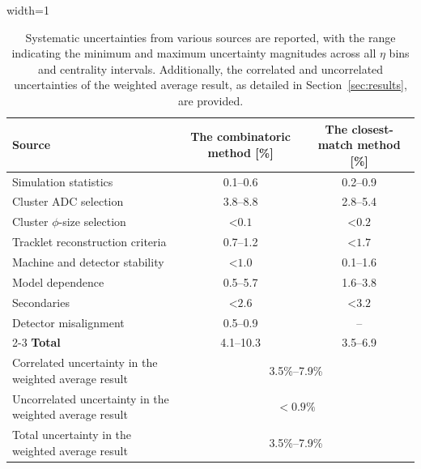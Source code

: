 \begin{table}[H]
    \centering
    \caption{Systematic uncertainties from various sources are reported, with the range indicating the minimum and maximum uncertainty magnitudes across all $\eta$ bins and centrality intervals. Additionally, the correlated and uncorrelated uncertainties of the weighted average result, as detailed in Section~\ref{sec:results}, are provided.}
    \begin{adjustbox}{width=1\textwidth}
    \begin{tabular}{l c c}
        \toprule[1pt]
        \textbf{Source} & \textbf{The combinatoric method [\%]} & \textbf{The closest-match method [\%]} \\
        \midrule[1pt]
        Simulation statistics & 0.1--0.6 & 0.2--0.9 \\
        Cluster ADC selection & 3.8--8.8 & 2.8--5.4 \\
        Cluster $\phi$-size selection & $<\text{0.1}$ & $<\text{0.2}$ \\
        Tracklet reconstruction criteria & 0.7--1.2 & $<\text{1.7}$ \\        
        Machine and detector stability & $<\text{1.0}$ & 0.1--1.6 \\
        Model dependence & 0.5--5.7 & 1.6--3.8 \\
        Secondaries & $<\text{2.6}$ & $<\text{3.2}$ \\
        Detector misalignment & 0.5--0.9 & -- \\\cmidrule(rl){2-3}
        \textbf{Total} & 4.1--10.3 & 3.5--6.9 \\
        \midrule[1pt]
        Correlated uncertainty in the weighted average result & \multicolumn{2}{c}{3.5\%--7.9\%} \\
        Uncorrelated uncertainty in the weighted average result & \multicolumn{2}{c}{$<\text{0.9}\%$} \\
        Total uncertainty in the weighted average result &\multicolumn{2}{c}{3.5\%--7.9\%} \\
        \bottomrule[1pt]
    \end{tabular}
    \label{tab:uncsummary}
    \end{adjustbox}
\end{table}